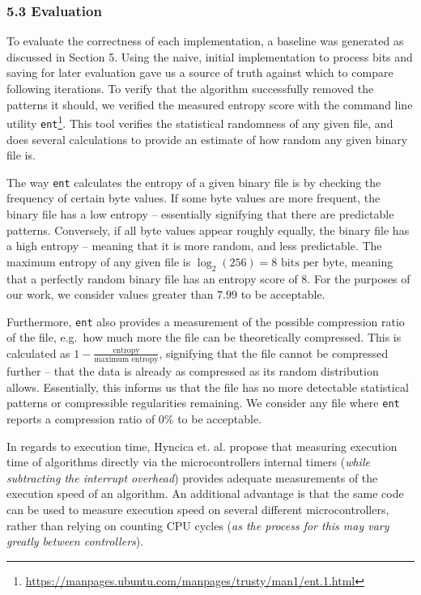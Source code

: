 \subsubsection{5.3 Evaluation}\label{evaluation}

To evaluate the correctness of each implementation, a baseline was generated as discussed in Section 5. Using the naive, initial implementation to process bits and saving for later evaluation gave us a source of truth against which to compare following iterations. To verify that the algorithm successfully removed the patterns it should, we verified the measured entropy score with the command line utility \texttt{ent}\footnote{\url{https://manpages.ubuntu.com/manpages/trusty/man1/ent.1.html}}. This tool verifies the statistical randomness of any given file, and does several calculations to provide an estimate of how random any given binary file is.

The way \texttt{ent} calculates the entropy of a given binary file is by checking the frequency of certain byte values. If some byte values are more frequent, the binary file has a low entropy -- essentially signifying that there are predictable patterns. Conversely, if all byte values appear roughly equally, the binary file has a high entropy -- meaning that it is more random, and less predictable. The maximum entropy of any given file is \(\log_2(256) = 8 \text{ bits per byte}\), meaning that a perfectly random binary file has an entropy score of 8. For the purposes of our work, we consider values greater than \(7.99\) to be acceptable.

Furthermore, \texttt{ent} also provides a measurement of the possible compression ratio of the file, e.g.~how much more the file can be theoretically compressed. This is calculated as \(1 - \frac{\text{entropy}}{\text{maximum entropy}}\), signifying that the file cannot be compressed further -- that the data is already as compressed as its random distribution allows. Essentially, this informs us that the file has no more detectable statistical patterns or compressible regularities remaining. We consider any file where \texttt{ent} reports a compression ratio of \(0\%\) to be acceptable.

In regards to execution time, Hyncica et. al. \cite{micromeasurements} propose that measuring execution time of algorithms directly via the microcontrollers internal timers (\emph{while subtracting the interrupt overhead}) provides adequate measurements of the execution speed of an algorithm. An additional advantage is that the same code can be used to measure execution speed on several different microcontrollers, rather than relying on counting CPU cycles (\emph{as the process for this may vary greatly between controllers}).


